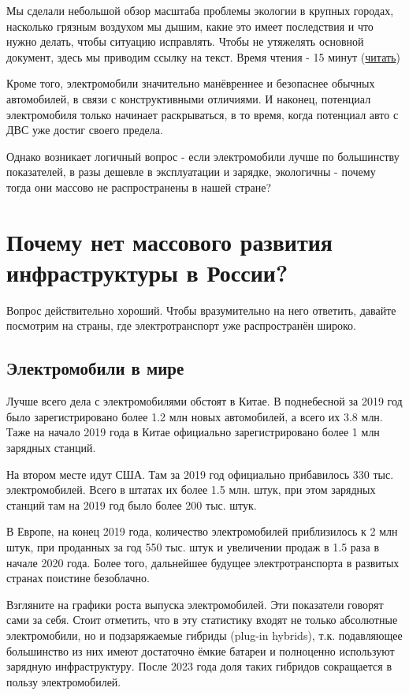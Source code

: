 \documentclass[a4paper,12pt]{report}
\begin{document}
Мы сделали небольшой обзор масштаба проблемы экологии в крупных городах, насколько грязным воздухом мы дышим, какие это имеет последствия и что нужно делать, чтобы ситуацию исправлять. Чтобы не утяжелять основной документ, здесь мы приводим ссылку на текст. Время чтения - 15 минут (\href {https://docs.google.com/document/d/1Xvn2jIdGmjOemTvSG5J-kHtrBBC3f-odBOGnE6IfGFw/edit}{читать})

Кроме того, электромобили значительно манёвреннее и безопаснее обычных автомобилей, в связи с конструктивными отличиями. И наконец, потенциал электромобиля только начинает раскрываться, в то время, когда потенциал авто с ДВС уже достиг своего предела.

Однако возникает логичный вопрос - если электромобили лучше по большинству показателей, в разы дешевле в эксплуатации и зарядке, экологичны - почему тогда они массово не распространены в нашей стране? 



\chapter{Почему нет массового развития инфраструктуры в России?}
Вопрос действительно хороший. Чтобы вразумительно на него ответить, давайте посмотрим на страны, где электротранспорт уже распространён широко. 

\section{Электромобили в мире}
Лучше всего дела с электромобилями обстоят в Китае. В поднебесной за 2019 год было зарегистрировано более 1.2 млн новых автомобилей, а всего их 3.8 млн. Таже на начало 2019 года в Китае официально зарегистрировано более 1 млн зарядных станций.

На втором месте идут США. Там за 2019 год официально прибавилось 330 тыс. электромобилей. Всего в штатах их более 1.5 млн. штук, при этом зарядных станций там на 2019 год было более 200 тыс. штук.

В Европе, на конец 2019 года, количество электромобилей приблизилось к 2 млн штук, при проданных за год 550 тыс. штук и увеличении продаж в 1.5 раза в начале 2020 года.
Более того, дальнейшее будущее электротранспорта в развитых странах поистине безоблачно. 

Взгляните на графики роста выпуска электромобилей. Эти показатели говорят сами за себя. Стоит отметить, что в эту статистику входят не только абсолютные электромобили, но и подзаряжаемые гибриды (plug-in hybrids), т.к. подавляющее большинство из них имеют достаточно ёмкие батареи и полноценно используют зарядную инфраструктуру.
После 2023 года доля таких гибридов сокращается в пользу электромобилей.
\end{document}
